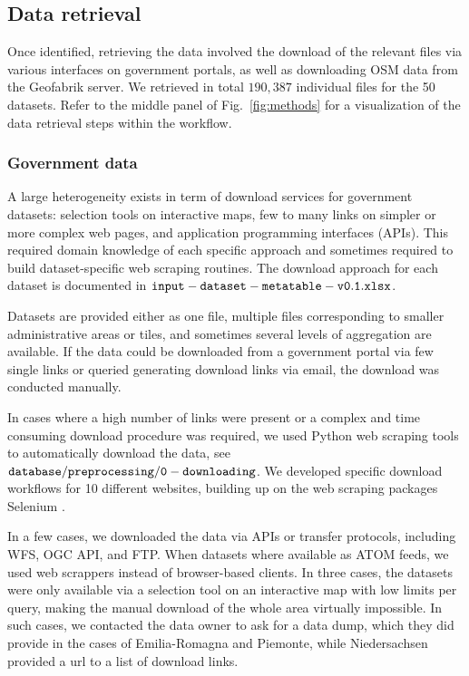 \documentclass[fleqn,10pt]{wlscirep}
\begin{document}
\subsection*{Data retrieval}

Once identified, retrieving the data involved the download of the relevant files via various interfaces on government portals, as well as downloading OSM data from the Geofabrik server. We retrieved in total $190,387$ individual files for the 50 datasets. Refer to the middle panel of Fig.~\ref{fig:methods} for a visualization of the data retrieval steps within the workflow.


\subsubsection*{Government data}

A large heterogeneity exists in term of download services for government datasets: selection tools on interactive maps, few to many links on simpler or more complex web pages, and  application programming interfaces (APIs). This required domain knowledge of each specific approach and sometimes required to build dataset-specific web scraping routines. The download approach for each dataset is documented in ${\tt input-dataset-metatable-v0.1.xlsx}$. 

Datasets are provided either as one file, multiple files corresponding to smaller administrative areas or tiles, and sometimes several levels of aggregation are available. If the data could be downloaded from a government portal via few single links or queried generating download links via email, the download was conducted manually.

In cases where a high number of links were present or a complex and time consuming download procedure was required, we used Python web scraping tools to automatically download the data, see ${\tt database/preprocessing/0-downloading}$\cite{eubucco-0.1-code2022}. 
We developed specific download workflows for 10 different websites, building up on the web scraping packages Selenium \cite{selenium_2022}.

In a few cases, we downloaded the data via APIs or transfer protocols, including WFS, OGC API, and FTP. When datasets where available as ATOM feeds, we used web scrappers instead of browser-based clients. 
In three cases, the datasets were only available via a selection tool on an interactive map with low limits per query, making the manual download of the whole area virtually impossible. In such cases, we contacted the data owner to ask for a data dump, which they did provide in the cases of Emilia-Romagna and Piemonte, while Niedersachsen provided a url to a list of download links.  
\end{document}
